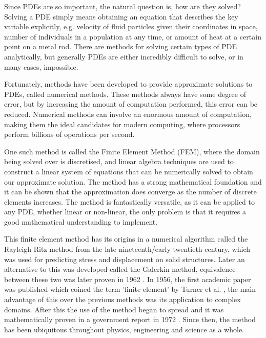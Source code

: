 Since PDEs are so important, the natural question is, how are they solved? Solving a PDE simply means obtaining an equation that describes the key variable explicitly, e.g. velocity of fluid particles given their coordinates in space, number of individuals in a population at any time, or amount of heat at a certain point on a metal rod. There are methods for solving certain types of PDE analytically, but generally PDEs are either incredibly difficult to solve, or in many cases, impossible.

Fortunately, methods have been developed to provide approximate solutions to PDEs, called numerical methods. These methods always have some degree of error, but by increasing the amount of computation performed, this error can be reduced. Numerical methods can involve an enormous amount of computation, making them the ideal candidates for modern computing, where processors perform billions of operations per second.

One such method is called the Finite Element Method (FEM), where the domain being solved over is discretised, and linear algebra techniques are used to construct a linear system of equations that can be numerically solved to obtain our approximate solution\cite{brenner-scott-fem}. The method has a strong mathematical foundation and it can be shown that the approximation does converge as the number of discrete elements increases\cite{bengzon-larson-fem}. The method is fantastically versatile, as it can be applied to any PDE, whether linear or non-linear, the only problem is that it requires a good mathematical understanding to implement.

This finite element method has its origins in a numerical algorithm called the Rayleigh-Ritz method from the late nineteenth/early twentieth century, which was used for predicting stress and displacement on solid structures\cite{w-ritz}. Later an alternative to this was developed called the Galerkin method, equivalence between these two was later proven in 1962 \cite{j-singer}. In 1956, the first academic paper was published which coined the term 'finite element' by Turner et al. \cite{turner-fem}, the main advantage of this over the previous methods was its application to complex domains. After this the use of the method began to spread and it was mathematically proven in a government report in 1972 \cite{osti_4589510}. Since then, the method has been ubiquitous throughout physics, engineering and science as a whole.



